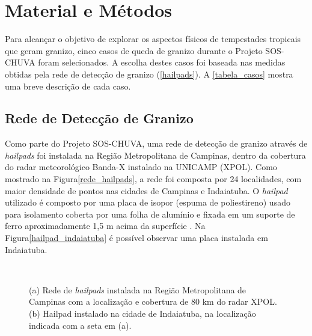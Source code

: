 \chapter{Material e Métodos}\label{database}

Para alcançar o objetivo de explorar os aspectos físicos de tempestades tropicais que geram granizo, cinco casos de queda de granizo durante o Projeto SOS-CHUVA foram selecionados. A escolha destes casos foi baseada nas medidas obtidas pela rede de detecção de granizo (\autoref{hailpads}). A \autoref{tabela_casos} mostra uma breve descrição de cada caso.



\section{Rede de Detecção de Granizo}\label{hailpads}

Como parte do Projeto SOS-CHUVA, uma rede de detecção de granizo através de \textit{hailpads} foi instalada na Região Metropolitana de Campinas, dentro da cobertura do radar meteorológico Banda-X instalado na UNICAMP (XPOL). Como mostrado na Figura\autoref{rede_hailpads}, a rede foi composta por 24 localidades, com maior densidade de pontos nas cidades de Campinas e Indaiatuba. O \textit{hailpad} utilizado é composto por uma placa de isopor (espuma de poliestireno) usado para isolamento coberta por uma folha de alumínio e fixada em um suporte de ferro aproximadamente 1,5 m acima da superfície \cite{ThomazJunior2016}. Na Figura\autoref{hailpad_indaiatuba} é possível observar uma placa instalada em Indaiatuba.

\begin{figure}[htb]
	\begin{center}
		\caption{(a) Rede de \textit{hailpads} instalada na Região Metropolitana de Campinas com a localização e cobertura de 80 km do radar XPOL. (b) Hailpad instalado na cidade de Indaiatuba, na localização indicada com a seta em (a).} 
		\label{overview_hailpads}
		\ \
		\\
	\end{center}
\end{figure}


